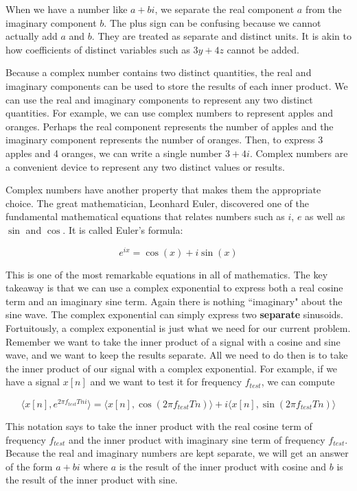 When we have a number like $a + bi$, we
separate the real component $a$ from the imaginary component $b$.  The plus sign can be confusing because we cannot actually add $a$ and $b$.  They are treated
as separate and distinct units. It is akin to how coefficients of distinct variables such as $3y + 4z$ cannot be added. 

Because a complex number contains two distinct quantities, the real and imaginary components can be used
to store the results of each inner product.  We can use the real and imaginary components to represent any
two distinct quantities.  For example, we can use complex numbers to represent apples and oranges.  
Perhaps the real component represents the number of apples and the imaginary component represents
the number of oranges.  Then, to express 3 apples and 4 oranges, we can write a single number
$3 + 4i$.  Complex numbers are a convenient device to represent any two distinct values or results.

Complex numbers have another property that makes them the appropriate choice.  The great 
mathematician, Leonhard Euler, discovered one of the fundamental mathematical equations
that relates numbers such as $i$, $e$ as well as $\sin$ and $\cos$.  It is called Euler's formula:

\begin{equation}
\label{eq:euler}
e^{ix} = \cos(x) + i\sin(x)
\end{equation}

This is one of the most remarkable equations in all of mathematics.  The key takeaway is that we can use
a complex exponential to express both a real cosine term and an imaginary sine term.  Again there is
nothing ``imaginary" about the sine wave.  The complex exponential can simply express two 
\textbf{separate} sinusoids.  Fortuitously, a complex exponential is just what we need for our current
problem.  Remember we want to take the inner product of a signal with a cosine and sine wave, and we want to 
keep the results separate.  All we need to do then is to take the inner product of our signal with a complex
exponential.  For example, if we have a signal $x[n]$ and
we want to test it for frequency $f_{test}$, we can compute 

$$\langle x[n], e^{2\pi f_{test}Tni}\rangle =  
\langle x[n], \cos(2\pi f_{test}Tn)\rangle + i\langle x[n], \sin(2\pi f_{test}Tn)\rangle$$  

\noindent This
notation says to take the inner product with the real cosine term of frequency $f_{test}$ and the inner
product with imaginary sine term of frequency $f_{test}$.  Because the real and imaginary numbers are kept
separate, we will get an answer of the form $a + bi$ where $a$ is the result of the inner product with cosine
and $b$ is the result of the inner product with sine. 


